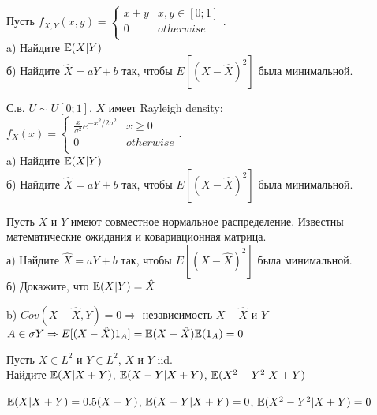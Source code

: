 \begin{problem}
Пусть $f_{X,Y}(x,y)=
\begin{cases}
  x+y & x,y \in [0;1] \\
  0 & otherwise \\
\end{cases}$. \\
a) Найдите $\mathbb{E}(X|Y)$ \\
б) Найдите $\hat{X}=aY+b$ так, чтобы $E[(X-\hat{X})^{2}]$ была
минимальной.

\begin{sol}

\end{sol}
\end{problem}

\begin{problem}
С.в. $U\sim U[0;1]$, $X$ имеет Rayleigh density: \\
$f_{X}(x)=
\begin{cases}
  \frac{x}{\sigma^{2}}e^{-x^{2}/2\sigma^{2}} & x\ge 0 \\
  0 & otherwise \\
\end{cases}$. \\
a) Найдите $\mathbb{E}(X|Y)$ \\
б) Найдите $\hat{X}=aY+b$ так, чтобы $E[(X-\hat{X})^{2}]$ была
минимальной.

\begin{sol}

\end{sol}
\end{problem}

\begin{problem}
Пусть $X$ и $Y$ имеют совместное нормальное распределение.
Известны математические ожидания и ковариационная матрица. \\
а) Найдите $\hat{X}=aY+b$ так, чтобы $E[(X-\hat{X})^{2}]$ была
минимальной. \\
б) Докажите, что $\mathbb{E}(X|Y)=\hat{X}$

\begin{sol}


b) $Cov(X-\hat{X},Y)=0 \Rightarrow $ независимость $X-\hat{X}$ и
$Y$ \\
$A\in\sigma{Y} \Rightarrow
E[(X-\hat{X})1_{A}]=\mathbb{E}(X-\hat{X})\mathbb{E}(1_{A})=0$
\end{sol}
\end{problem}

\begin{problem}
Пусть $X\in L^{2}$ и $Y\in L^{2}$, $X$ и $Y$ iid. \\
Найдите $\mathbb{E}(X|X+Y)$, $\mathbb{E}(X-Y|X+Y)$, $\mathbb{E}(X^{2}-Y^{2}|X+Y)$

\begin{sol}

$\mathbb{E}(X|X+Y)=0.5(X+Y)$, $\mathbb{E}(X-Y|X+Y)=0$, $\mathbb{E}(X^{2}-Y^{2}|X+Y)=0$
\end{sol}
\end{problem}

